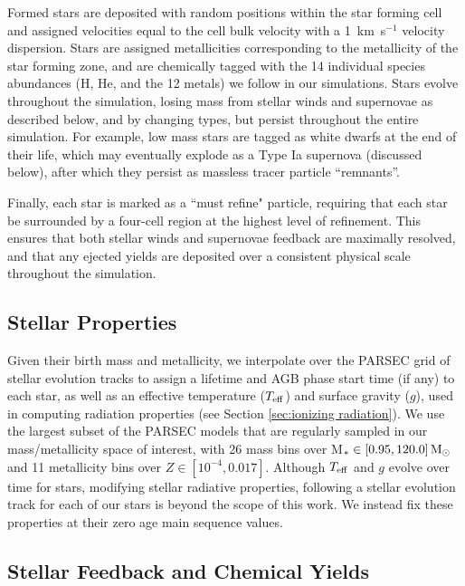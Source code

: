 \documentclass[twocolumn]{aastex61}
\begin{document}
Formed stars are deposited with random positions within the star forming cell and assigned velocities equal to the cell bulk velocity with a 1~km~s$^{-1}$ velocity dispersion. Stars are assigned metallicities corresponding to the metallicity of the star forming zone, and are chemically tagged with the 14 individual species abundances (H, He, and the 12 metals) we follow in our simulations. Stars evolve throughout the simulation, losing mass from stellar winds and supernovae as described below, and by changing types, but persist throughout the entire simulation. For example, low mass stars are tagged as white dwarfs at the end of their life, which may eventually explode as a Type Ia supernova (discussed below), after which they persist as massless tracer particle ``remnants''. 

Finally, each star is marked as a ``must refine" particle, requiring that each star be surrounded by a four-cell region at the highest level of refinement. This ensures that both stellar winds and supernovae feedback are maximally resolved, and that any ejected yields are deposited over a consistent physical scale throughout the simulation.

\subsection{Stellar Properties}
\label{sec:properties}
Given their birth mass and metallicity, we interpolate over the PARSEC grid of stellar evolution tracks \citep{Bressan2012} to assign a lifetime and AGB phase start time (if any) to each star, as well as an effective temperature ($T_{\rm eff}$) and surface gravity ($g$), used in computing radiation properties (see Section \ref{sec:ionizing radiation}). We use the largest subset of the PARSEC models that are regularly sampled in our mass/metallicity space of interest, with 26 mass bins over M$_{*} \in \left[0.95, 120.0 \right] {\rm M_{\odot}}$ and 11 metallicity bins over $Z \in \left[10^{-4}, 0.017 \right]$. Although $T_{\rm eff}$ and $g$ evolve over time for stars, modifying stellar radiative properties, following a stellar evolution track for each of our stars is beyond the scope of this work. We instead fix these properties at their zero age main sequence values.

\subsection{Stellar Feedback and Chemical Yields}
\end{document}
